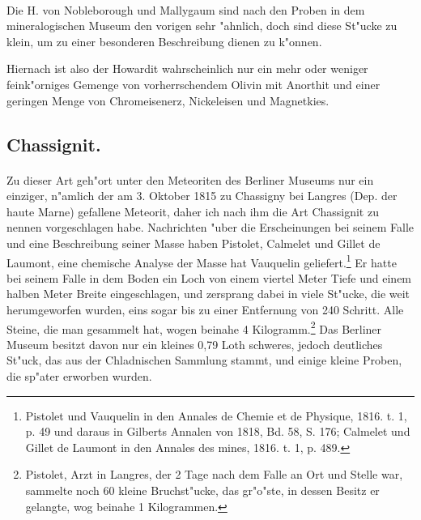 \documentclass[a4paper, 11pt, oneside]{article}
\begin{document}
\paragraph{}
Die H. von Nobleborough und Mallygaum sind nach den Proben in dem mineralogischen Museum den vorigen sehr "ahnlich, doch sind diese St"ucke zu klein, um zu einer besonderen Beschreibung dienen zu k"onnen.

Hiernach ist also der Howardit wahrscheinlich nur ein mehr oder weniger feink"orniges Gemenge von vorherrschendem Olivin mit Anorthit und einer geringen Menge von Chromeisenerz, Nickeleisen und Magnetkies.
\subsection{Chassignit.}
\paragraph{}
Zu dieser Art geh"ort unter den Meteoriten des Berliner Museums nur ein einziger, n"amlich der am 3. Oktober 1815 zu Chassigny bei Langres (Dep. der haute Marne) gefallene Meteorit, daher ich nach ihm die Art Chassignit zu nennen vorgeschlagen habe. Nachrichten "uber die Erscheinungen bei seinem Falle und eine Beschreibung seiner Masse haben Pistolet, Calmelet und Gillet de Laumont, eine chemische Analyse der Masse hat Vauquelin geliefert.\footnote{Pistolet und Vauquelin in den Annales de Chemie et de Physique, 1816. t. 1, p. 49 und daraus in Gilberts Annalen von 1818, Bd. 58, S. 176; Calmelet und Gillet de Laumont in den Annales des mines, 1816. t. 1, p. 489.} Er hatte bei seinem Falle in dem Boden ein Loch von einem viertel Meter Tiefe und einem halben Meter Breite eingeschlagen, und zersprang dabei in viele St"ucke, die weit herumgeworfen wurden, eins sogar bis zu einer Entfernung von 240 Schritt. Alle Steine, die man gesammelt hat, wogen beinahe 4 Kilogramm.\footnote{Pistolet, Arzt in Langres, der 2 Tage nach dem Falle an Ort und Stelle war, sammelte noch 60 kleine Bruchst"ucke, das gr"o"ste, in dessen Besitz er gelangte, wog beinahe 1 Kilogrammen.} Das Berliner Museum besitzt davon nur ein kleines 0,79 Loth schweres, jedoch deutliches St"uck, das aus der Chladnischen Sammlung stammt, und einige kleine Proben, die sp"ater erworben wurden.
\end{document}
